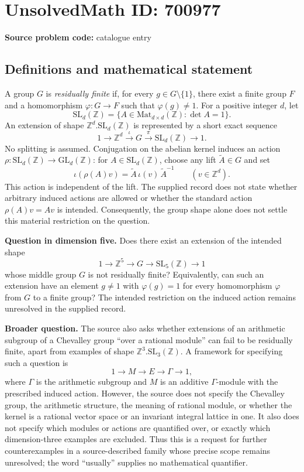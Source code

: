 \documentclass[11pt]{article}
\newcommand{\Z}{\mathbb{Z}}
\begin{document}
\section*{UnsolvedMath ID: 700977}
\textbf{Source problem code:} catalogue entry
\subsection{Definitions and mathematical statement}
A group \(G\) is \emph{residually finite} if, for every \(g\in G\setminus\{1\}\), there exist a finite group \(F\) and a homomorphism \(\varphi:G\to F\) such that \(\varphi(g)\ne 1\). For a positive integer \(d\), let
\[
\mathrm{SL}_d(\Z)=\{A\in\mathrm{Mat}_{d\times d}(\Z):\det A=1\}.
\]
An extension of shape \(\Z^d.\mathrm{SL}_d(\Z)\) is represented by a short exact sequence
\[
1\longrightarrow\Z^d\xrightarrow{\iota}G\xrightarrow{\pi}\mathrm{SL}_d(\Z)\longrightarrow1.
\]
No splitting is assumed. Conjugation on the abelian kernel induces an action \(\rho:\mathrm{SL}_d(\Z)\to\mathrm{GL}_d(\Z)\): for \(A\in\mathrm{SL}_d(\Z)\), choose any lift \(\widetilde A\in G\) and set
\[
\iota(\rho(A)v)=\widetilde A\,\iota(v)\,\widetilde A^{-1}\qquad(v\in\Z^d).
\]
This action is independent of the lift. The supplied record does not state whether arbitrary induced actions are allowed or whether the standard action \(\rho(A)v=Av\) is intended. Consequently, the group shape alone does not settle this material restriction on the question.

\textbf{Question in dimension five.} Does there exist an extension of the intended shape
\[
1\longrightarrow\Z^5\longrightarrow G\longrightarrow\mathrm{SL}_5(\Z)\longrightarrow1
\]
whose middle group \(G\) is not residually finite? Equivalently, can such an extension have an element \(g\ne1\) with \(\varphi(g)=1\) for every homomorphism \(\varphi\) from \(G\) to a finite group? The intended restriction on the induced action remains unresolved in the supplied record.

\textbf{Broader question.} The source also asks whether extensions of an arithmetic subgroup of a Chevalley group ``over a rational module'' can fail to be residually finite, apart from examples of shape \(\Z^3.\mathrm{SL}_3(\Z)\). A framework for specifying such a question is
\[
1\longrightarrow M\longrightarrow E\longrightarrow\Gamma\longrightarrow1,
\]
where \(\Gamma\) is the arithmetic subgroup and \(M\) is an additive \(\Gamma\)-module with the prescribed induced action. However, the source does not specify the Chevalley group, the arithmetic structure, the meaning of rational module, or whether the kernel is a rational vector space or an invariant integral lattice in one. It also does not specify which modules or actions are quantified over, or exactly which dimension-three examples are excluded. Thus this is a request for further counterexamples in a source-described family whose precise scope remains unresolved; the word ``usually'' supplies no mathematical quantifier.
\end{document}
